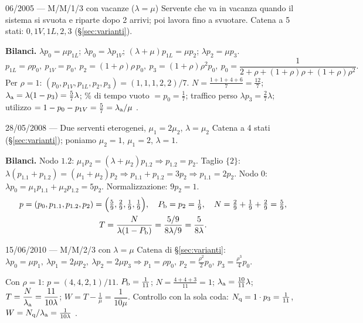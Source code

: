 \begin{esempio}{06/2005 --- M/M/1/3 con vacanze ($\lambda=\mu$)}
Servente che va in vacanza quando il sistema si svuota e riparte dopo 2 arrivi; poi lavora fino a svuotare. Catena a 5 stati: $0,1V,1L,2,3$ (§\ref{sec:varianti}).

\textbf{Bilanci.} $\lambda p_0=\mu p_{1L}$; $\lambda p_0=\lambda p_{1V}$; $(\lambda+\mu)p_{1L}=\mu p_2$; $\lambda p_2=\mu p_3$.
\[
p_{1L}=\rho p_0,\ p_{1V}=p_0,\ p_2=(1+\rho)\rho\,p_0,\ p_3=(1+\rho)\rho^2p_0,\
p_0=\frac{1}{2+\rho+(1+\rho)\rho+(1+\rho)\rho^2}.
\]
Per $\rho=1$: $(p_0,p_{1V},p_{1L},p_2,p_3)=(1,1,1,2,2)/7$. $N=\tfrac{1+1+4+6}{7}=\tfrac{12}7$; $\lambda_{\mathrm{a}}=\lambda(1-p_3)=\tfrac57\lambda$; \% di tempo vuoto $=p_0=\tfrac17$; traffico perso $\lambda p_3=\tfrac27\lambda$; utilizzo $=1-p_0-p_{1V}=\tfrac57=\lambda_{\mathrm{a}}/\mu$ \checkmark.
\end{esempio}

\begin{esempio}{28/05/2008 --- Due serventi eterogenei, $\mu_1=2\mu_2$, $\lambda=\mu_2$}
Catena a 4 stati (§\ref{sec:varianti}); poniamo $\mu_2=1$, $\mu_1=2$, $\lambda=1$.

\textbf{Bilanci.} Nodo $1.2$: $\mu_1p_2=(\lambda+\mu_2)p_{1.2}\Rightarrow p_{1.2}=p_2$. Taglio $\{2\}$: $\lambda(p_{1.1}+p_{1.2})=(\mu_1+\mu_2)p_2\Rightarrow p_{1.1}+p_{1.2}=3p_2\Rightarrow p_{1.1}=2p_2$. Nodo $0$: $\lambda p_0=\mu_1p_{1.1}+\mu_2p_{1.2}=5p_2$. Normalizzazione: $9p_2=1$.
\[\begin{gathered}
p=(p_0,p_{1.1},p_{1.2},p_2)=\Big(\tfrac59,\tfrac29,\tfrac19,\tfrac19\Big),\quad
P_{\mathrm{b}}=p_2=\tfrac19,\quad N=\tfrac29+\tfrac19+\tfrac29=\tfrac59,\\
T=\frac{N}{\lambda(1-P_{\mathrm{b}})}=\frac{5/9}{8\lambda/9}=\frac{5}{8\lambda}.
\end{gathered}\]
\end{esempio}

\begin{esempio}{15/06/2010 --- M/M/2/3 con $\lambda=\mu$}
Catena di §\ref{sec:varianti}: $\lambda p_0=\mu p_1,\ \lambda p_1=2\mu p_2,\ \lambda p_2=2\mu p_3\Rightarrow p_1=\rho p_0,\ p_2=\tfrac{\rho^2}2p_0,\ p_3=\tfrac{\rho^3}4p_0$.

Con $\rho=1$: $p=(4,4,2,1)/11$. $P_{\mathrm{b}}=\tfrac1{11}$; $N=\tfrac{4+4+3}{11}=1$; $\lambda_{\mathrm{a}}=\tfrac{10}{11}\lambda$; $T=\dfrac{N}{\lambda_{\mathrm{a}}}=\dfrac{11}{10\lambda}$; $W=T-\tfrac1\mu=\dfrac1{10\mu}$. Controllo con la sola coda: $N_{\mathrm{q}}=1\cdot p_3=\tfrac1{11}$, $W=N_{\mathrm{q}}/\lambda_{\mathrm{a}}=\tfrac1{10\lambda}$ \checkmark.
\end{esempio}

